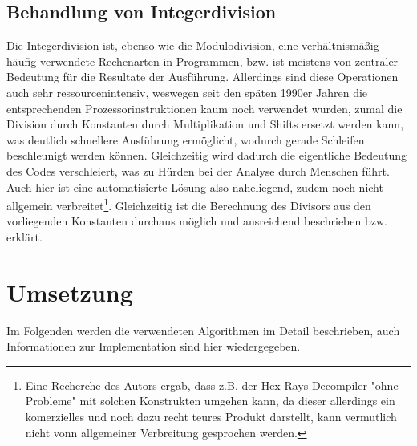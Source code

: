 \documentclass[11pt]{article} %
\begin{document}
\subsection{Behandlung von Integerdivision} Die Integerdivision ist, ebenso wie die Modulodivision,
eine verhältnismäßig häufig verwendete Rechenarten in Programmen, bzw. ist meistens von zentraler
Bedeutung für die Resultate der Ausführung. Allerdings sind diese Operationen auch sehr
ressourcenintensiv, weswegen seit den späten 1990er Jahren die entsprechenden Prozessorinstruktionen
kaum noch verwendet wurden, zumal die Division durch Konstanten durch Multiplikation und Shifts
ersetzt werden kann, was deutlich schnellere Ausführung ermöglicht\cite{division:2}, wodurch
gerade Schleifen beschleunigt werden können. Gleichzeitig wird dadurch die eigentliche
Bedeutung des Codes verschleiert, was zu Hürden bei der Analyse durch Menschen führt. Auch hier ist
eine automatisierte Lösung also naheliegend, zudem noch nicht allgemein verbreitet\footnote{Eine
Recherche des Autors ergab, dass z.B. der Hex-Rays Decompiler "ohne Probleme" mit solchen
Konstrukten umgehen kann, da dieser allerdings ein komerzielles und noch dazu recht teures Produkt
darstellt, kann vermutlich nicht vonn allgemeiner Verbreitung gesprochen werden.}. Gleichzeitig ist
die Berechnung des Divisors aus den vorliegenden Konstanten durchaus möglich und ausreichend
beschrieben bzw. erklärt\cite{stackexchange:4}.

\section{Umsetzung} Im Folgenden werden die verwendeten Algorithmen im Detail beschrieben,
auch Informationen zur Implementation sind hier wiedergegeben.
\end{document}
